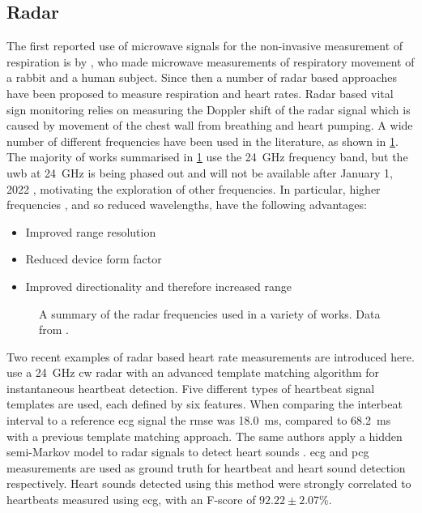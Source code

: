 \documentclass[11pt, parskip=half*,twoside=false]{scrbook}
\begin{document}
\subsection{Radar}
The first reported use of microwave signals for the non-invasive measurement of respiration is by \citet{linNoninvasiveMicrowaveMeasurement1975}, who made microwave measurements of respiratory movement of a rabbit and a human subject. Since then a number of radar based approaches have been proposed to measure respiration and heart rates. Radar based vital sign monitoring relies on measuring the Doppler shift of the radar signal which is caused by movement of the chest wall from breathing and heart pumping. A wide number of different frequencies have been used in the literature, as shown in \cref{fig:radar_freqs}. The majority of works summarised in \cref{fig:radar_freqs} use the 24~GHz frequency band, but the \gls{uwb} at 24~GHz is being phased out and will not be available after January 1, 2022 \citep{ramasubramanianMovingLegacy242018}, motivating the exploration of other frequencies. In particular, higher frequencies , and so reduced wavelengths, have the following advantages: 
\begin{itemize}
	\item Improved range resolution
	\item Reduced device form factor
	\item Improved directionality and therefore increased range
\end{itemize}

\begin{figure}[h]
	\centering
	
	\caption{A summary of the radar frequencies used in a variety of works. Data from \citet{singhMultiResidentNonContactVital2021}.}
	\label{fig:radar_freqs}
\end{figure}

Two recent examples of radar based heart rate measurements are introduced here.  \citet{willAdvancedTemplateMatching2017} use a 24~GHz \gls{cw} radar with an advanced template matching algorithm for instantaneous heartbeat detection. Five different types of heartbeat signal templates are used, each defined by six features. When comparing the interbeat interval to a reference \gls{ecg} signal the \gls{rmse} was 18.0~ms, compared to 68.2~ms with a previous template matching approach. The same authors apply a hidden semi-Markov model to radar signals to detect heart sounds \citep{willRadarBasedHeartSound2018}. \gls{ecg} and \gls{pcg} measurements are used as ground truth for heartbeat and heart sound detection respectively. Heart sounds detected using this method were strongly correlated to heartbeats measured using \gls{ecg}, with an F-score of $92.22\pm 2.07 \%$.
\end{document}
